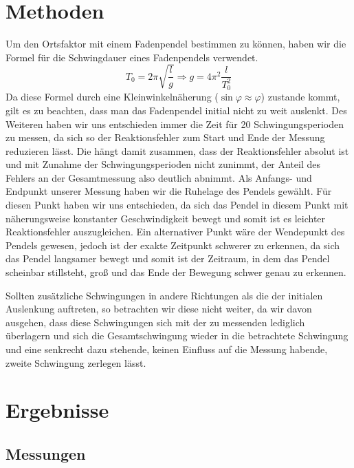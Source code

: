 \documentclass[
	a4paper,
	12pt,
	pagesize,
	ngerman
]{scrartcl}
\begin{document}
	\section{Methoden}
	Um den Ortsfaktor mit einem Fadenpendel bestimmen zu können, haben wir die Formel für die Schwingdauer eines Fadenpendels verwendet.
		\begin{equation}\label{eq:Ortsfaktor}
			T_0 = 2\pi \sqrt{\frac{l}{g}}
			\Rightarrow{} g = 4\pi{}^2\frac{l}{T_0^2}
		\end{equation}
	Da diese Formel durch eine Kleinwinkelnäherung (\(\sin{\varphi} \approx \varphi \)) zustande kommt, gilt es zu beachten, dass man das Fadenpendel initial nicht zu weit auslenkt. %
	Des Weiteren haben wir uns entschieden immer die Zeit für 20 Schwingungsperioden zu messen, da sich so der Reaktionsfehler zum Start und Ende der Messung reduzieren lässt. Die hängt damit zusammen, dass der Reaktionsfehler absolut ist und mit Zunahme der Schwingungsperioden nicht zunimmt, der Anteil des Fehlers an der Gesamtmessung also deutlich abnimmt.
	Als Anfangs- und Endpunkt unserer Messung haben wir die Ruhelage des Pendels gewählt. Für diesen Punkt haben wir uns entschieden, da sich das Pendel in diesem Punkt mit näherungsweise konstanter Geschwindigkeit bewegt und somit ist es leichter Reaktionsfehler auszugleichen. Ein alternativer Punkt wäre der Wendepunkt des Pendels gewesen, jedoch ist der exakte Zeitpunkt schwerer zu erkennen, da sich das Pendel langsamer bewegt und somit ist der Zeitraum, in dem das Pendel scheinbar stillsteht, groß und das Ende der Bewegung schwer genau zu erkennen.\par %
	Sollten zusätzliche Schwingungen in andere Richtungen als die der initialen Auslenkung auftreten, so betrachten wir diese nicht weiter, da wir davon ausgehen, dass diese Schwingungen sich mit der zu messenden lediglich überlagern und sich die Gesamtschwingung wieder in die betrachtete Schwingung und eine senkrecht dazu stehende, keinen Einfluss auf die Messung habende, zweite Schwingung zerlegen lässt.
	\section{Ergebnisse}
	\subsection{Messungen}
\end{document}
